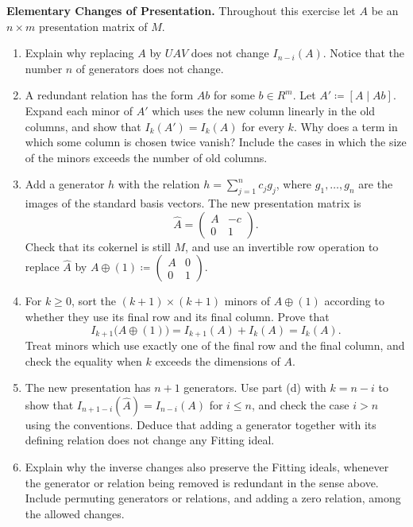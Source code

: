 \documentclass[12pt,reqno]{amsart}
\begin{document}
\begin{problems}
\item\label{s:presentation-moves} \textbf{Elementary Changes of Presentation.} Throughout this exercise let $A$ be an $n\times m$ presentation matrix of $M$.
\begin{enumerate}
\item Explain why replacing $A$ by $UAV$ does not change $I_{n-i}(A)$. Notice that the number $n$ of generators does not change.
\item A redundant relation has the form $Ab$ for some $b\in R^m$. Let $A'\coloneqq[A\mid Ab]$. Expand each minor of $A'$ which uses the new column linearly in the old columns, and show that $I_k(A')=I_k(A)$ for every $k$. Why does a term in which some column is chosen twice vanish? Include the cases in which the size of the minors exceeds the number of old columns.
\item Add a generator $h$ with the relation $h=\sum_{j=1}^nc_jg_j$, where $g_1,\ldots,g_n$ are the images of the standard basis vectors. The new presentation matrix is
\[
\widehat A=\begin{pmatrix}A&-c\\0&1\end{pmatrix}.
\]
Check that its cokernel is still $M$, and use an invertible row operation to replace $\widehat A$ by $A\oplus(1)\coloneqq\left(\begin{smallmatrix}A&0\\0&1\end{smallmatrix}\right)$.
\item For $k\geq0$, sort the $(k+1)\times(k+1)$ minors of $A\oplus(1)$ according to whether they use its final row and its final column. Prove that
\[
I_{k+1}\bigl(A\oplus(1)\bigr)=I_{k+1}(A)+I_k(A)=I_k(A).
\]
Treat minors which use exactly one of the final row and the final column, and check the equality when $k$ exceeds the dimensions of $A$.
\item The new presentation has $n+1$ generators. Use part (d) with $k=n-i$ to show that $I_{n+1-i}(\widehat A)=I_{n-i}(A)$ for $i\leq n$, and check the case $i>n$ using the conventions. Deduce that adding a generator together with its defining relation does not change any Fitting ideal.
\item Explain why the inverse changes also preserve the Fitting ideals, whenever the generator or relation being removed is redundant in the sense above. Include permuting generators or relations, and adding a zero relation, among the allowed changes.
\end{enumerate}
\end{problems}
\end{document}
